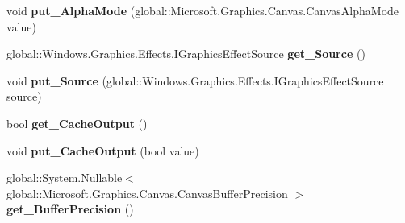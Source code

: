 \begin{DoxyCompactItemize}
\item 
\mbox{\label{class_microsoft_1_1_graphics_1_1_canvas_1_1_effects_1_1_edge_detection_effect_a9a08543abae46a861e546beeb02a638c}} 
void {\bfseries put\+\_\+\+Alpha\+Mode} (global\+::\+Microsoft.\+Graphics.\+Canvas.\+Canvas\+Alpha\+Mode value)
\item 
\mbox{\label{class_microsoft_1_1_graphics_1_1_canvas_1_1_effects_1_1_edge_detection_effect_ac8fd2f7175d97d5cf3d30307d9f39bb1}} 
global\+::\+Windows.\+Graphics.\+Effects.\+I\+Graphics\+Effect\+Source {\bfseries get\+\_\+\+Source} ()
\item 
\mbox{\label{class_microsoft_1_1_graphics_1_1_canvas_1_1_effects_1_1_edge_detection_effect_aed3a83c6bc8c2c6a67cb52bca65aae15}} 
void {\bfseries put\+\_\+\+Source} (global\+::\+Windows.\+Graphics.\+Effects.\+I\+Graphics\+Effect\+Source source)
\item 
\mbox{\label{class_microsoft_1_1_graphics_1_1_canvas_1_1_effects_1_1_edge_detection_effect_ad9acd7ed55c1971ffe022c3848cc0833}} 
bool {\bfseries get\+\_\+\+Cache\+Output} ()
\item 
\mbox{\label{class_microsoft_1_1_graphics_1_1_canvas_1_1_effects_1_1_edge_detection_effect_a665e4e3a6aa6d68d49cae6080a44919d}} 
void {\bfseries put\+\_\+\+Cache\+Output} (bool value)
\item 
\mbox{\label{class_microsoft_1_1_graphics_1_1_canvas_1_1_effects_1_1_edge_detection_effect_a9a20248c4218fdf2bbbee08ebe1e3b8d}} 
global\+::\+System.\+Nullable$<$ global\+::\+Microsoft.\+Graphics.\+Canvas.\+Canvas\+Buffer\+Precision $>$ {\bfseries get\+\_\+\+Buffer\+Precision} ()
\item 
\mbox{\label{class_microsoft_1_1_graphics_1_1_canvas_1_1_effects_1_1_edge_detection_effect_ae9dd637437aac7079efa6904e19ba163}} 

\end{DoxyCompactItemize}
